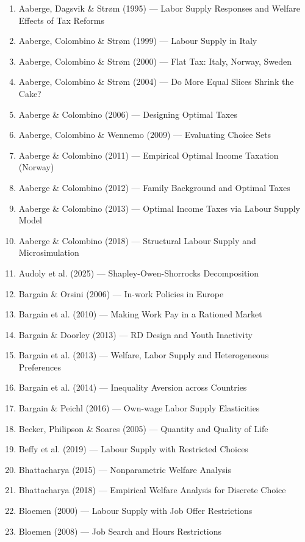 \documentclass[11pt,a4paper]{article}
\begin{document}
\begin{enumerate}
  \item Aaberge, Dagsvik \& Strøm (1995) — Labor Supply Responses and Welfare Effects of Tax Reforms
  \item Aaberge, Colombino \& Strøm (1999) — Labour Supply in Italy
  \item Aaberge, Colombino \& Strøm (2000) — Flat Tax: Italy, Norway, Sweden
  \item Aaberge, Colombino \& Strøm (2004) — Do More Equal Slices Shrink the Cake?
  \item Aaberge \& Colombino (2006) — Designing Optimal Taxes
  \item Aaberge, Colombino \& Wennemo (2009) — Evaluating Choice Sets
  \item Aaberge \& Colombino (2011) — Empirical Optimal Income Taxation (Norway)
  \item Aaberge \& Colombino (2012) — Family Background and Optimal Taxes
  \item Aaberge \& Colombino (2013) — Optimal Income Taxes via Labour Supply Model
  \item Aaberge \& Colombino (2018) — Structural Labour Supply and Microsimulation
  \item Audoly et al. (2025) — Shapley-Owen-Shorrocks Decomposition
  \item Bargain \& Orsini (2006) — In-work Policies in Europe
  \item Bargain et al. (2010) — Making Work Pay in a Rationed Market
  \item Bargain \& Doorley (2013) — RD Design and Youth Inactivity
  \item Bargain et al. (2013) — Welfare, Labor Supply and Heterogeneous Preferences
  \item Bargain et al. (2014) — Inequality Aversion across Countries
  \item Bargain \& Peichl (2016) — Own-wage Labor Supply Elasticities
  \item Becker, Philipson \& Soares (2005) — Quantity and Quality of Life
  \item Beffy et al. (2019) — Labour Supply with Restricted Choices
  \item Bhattacharya (2015) — Nonparametric Welfare Analysis
  \item Bhattacharya (2018) — Empirical Welfare Analysis for Discrete Choice
  \item Bloemen (2000) — Labour Supply with Job Offer Restrictions
  \item Bloemen (2008) — Job Search and Hours Restrictions

\end{enumerate}
\end{document}
